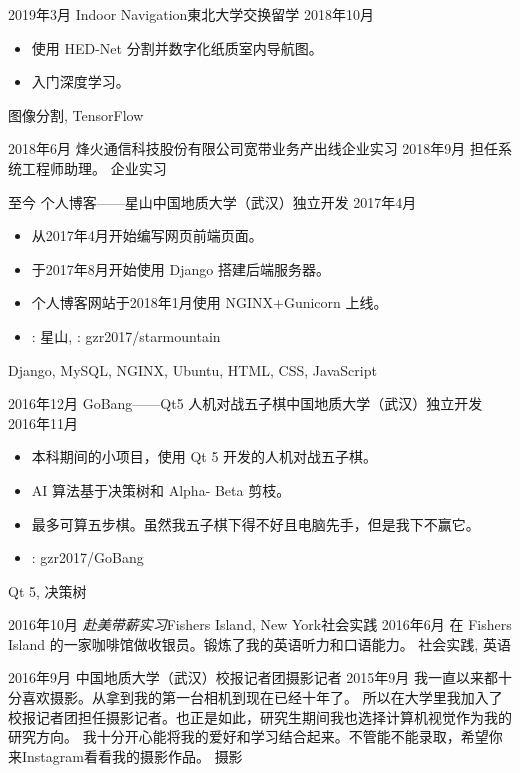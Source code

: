 \begin{experiences}
  \experience
  { 2019年3月} {Indoor Navigation}{東北大学}{交换留学}
  {2018年10月}    {
    \begin{itemize}
      \item 使用 HED-Net 分割并数字化纸质室内导航图。
      \item 入门深度学习。
    \end{itemize}
  }
  {图像分割, TensorFlow}
  \emptySeparator



  \experience
  {2018年6月} {烽火通信科技股份有限公司}{宽带业务产出线}{企业实习}
  {2018年9月 }    {
    担任系统工程师助理。
  }
  {企业实习}
  \emptySeparator

  \experience
  {至今} {个人博客——星山}{中国地质大学（武汉）}{独立开发}
  {2017年4月}    {
    \begin{itemize}
      \item  从2017年4月开始编写网页前端页面。
      \item 于2017年8月开始使用 Django 搭建后端服务器。
      \item 个人博客网站于2018年1月使用 NGINX+Gunicorn 上线。
      \item \faLink:  {星山}, \faGithub:  {gzr2017/starmountain}
    \end{itemize}
  }
  {Django, MySQL, NGINX, Ubuntu, HTML, CSS, JavaScript}
  \emptySeparator

  \experience
  {2016年12月} {GoBang——Qt5 人机对战五子棋}{中国地质大学（武汉）}{独立开发}
  {2016年11月}    {
    \begin{itemize}
      \item  本科期间的小项目，使用 Qt 5 开发的人机对战五子棋。
      \item AI 算法基于决策树和 Alpha- Beta 剪枝。
      \item  最多可算五步棋。虽然我五子棋下得不好且电脑先手，但是我下不赢它。
      \item \faGithub:  {gzr2017/GoBang}
    \end{itemize}
  }
  {Qt 5, 决策树}
  \emptySeparator

  \experience
  {2016年10月} {\emph{赴美带薪实习}}{Fishers Island, New York}{社会实践}
  {2016年6月}    {
   在 Fishers Island 的一家咖啡馆做收银员。锻炼了我的英语听力和口语能力。
  }
  {社会实践, 英语}
  \emptySeparator

  \experience
  {2016年9月} {中国地质大学（武汉）}{校报记者团}{摄影记者}
  {2015年9月}    {
    我一直以来都十分喜欢摄影。从拿到我的第一台相机到现在已经十年了。
    所以在大学里我加入了校报记者团担任摄影记者。也正是如此，研究生期间我也选择计算机视觉作为我的研究方向。
    我十分开心能将我的爱好和学习结合起来。不管能不能录取，希望你来Instagram看看我的摄影作品。
  }
  {摄影}
\end{experiences}
